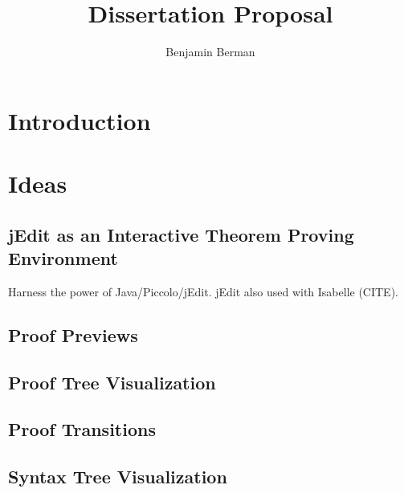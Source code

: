 \documentclass[11pt]{amsart}
\title{Dissertation Proposal}
\author{Benjamin Berman}
\begin{document}
\maketitle
\section{Introduction}

\section{Ideas}

\subsection{jEdit as an Interactive Theorem Proving Environment}

Harness the power of Java/Piccolo/jEdit.  jEdit also used with Isabelle (CITE).

\subsection{Proof Previews}

\subsection{Proof Tree Visualization}

\subsection{Proof Transitions}

\subsection{Syntax Tree Visualization}
\end{document}
